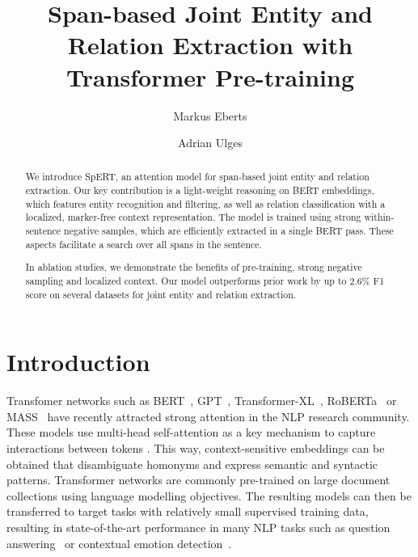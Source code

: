 \documentclass{ecai}
\begin{document}
\title{Span-based Joint Entity and Relation Extraction with Transformer Pre-training}
\author{Markus Eberts \and Adrian Ulges}
\maketitle


\begin{abstract}
We introduce SpERT, an attention model for span-based joint entity and relation extraction.  Our key contribution is a light-weight reasoning on BERT embeddings, which features entity recognition and filtering, as well as relation classification with a localized, marker-free context representation. The model is trained using strong within-sentence negative samples, which are efficiently extracted in a single BERT pass. These aspects facilitate a search over all spans in the sentence. 

In ablation studies, we demonstrate the benefits of pre-training, strong negative sampling and localized context. Our model outperforms prior work by up to 2.6\% F1 score on several datasets for joint entity and relation extraction. 
\end{abstract}

\section{Introduction}
Transfomer networks such as BERT~\cite{devlin:2018:bert}, GPT~\cite{radford:2018:lm_transformer}, Transformer-XL~\cite{dai:2019:transformer_xl}, RoBERTa~\cite{liu:2019:roberta} or MASS~\cite{song:2019:mass} have recently attracted strong attention in the NLP research community. These models use multi-head self-attention as a key mechanism to capture interactions between tokens \cite{bahdanau:2014:machine_translation_joint,vaswani:2017:transformer}. This way, context-sensitive embeddings can be obtained that disambiguate homonyms and express semantic and syntactic patterns. 
Transformer networks are commonly pre-trained on large document collections using language modelling objectives. The resulting models can then be transferred to target tasks with relatively small supervised training data, resulting in state-of-the-art performance in many NLP tasks such as question answering~\cite{yang:2019:qa} or contextual emotion detection~\cite{chatterjee:2019:semeval_emotion}.
\end{document}
